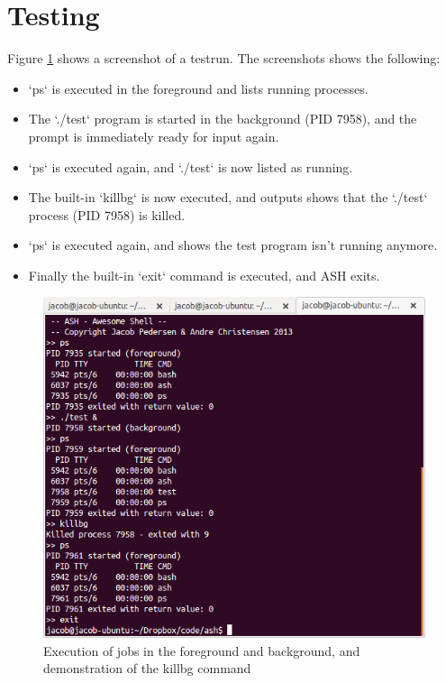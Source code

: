 \documentclass[pdftex, a4paper,12pt]{article}
\begin{document}
\section{Testing}
Figure \ref{fig:1} shows a screenshot of a testrun. The screenshots shows the following:

\begin{itemize}
	\item `ps` is executed in the foreground and lists running processes.
	\item The `./test` program is started in the background (PID 7958), and the prompt is immediately ready for input again.
	\item `ps` is executed again, and `./test` is now listed as running.
	\item The built-in `killbg` is now executed, and outputs shows that the `./test` process (PID 7958) is killed.
	\item `ps` is executed again, and shows the test program isn't running anymore.
	\item Finally the built-in `exit` command is executed, and ASH exits.
\end{itemize}

\begin{figure}[!ht]
	\centering
	\includegraphics[width=1\textwidth]{testing}
	\caption{Execution of jobs in the foreground and background, and demonstration of the killbg command}
	\label{fig:1}
\end{figure}
\end{document}
